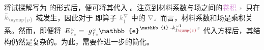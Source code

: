 将试探解写为  的形式后，便可将其代入 。注意到材料系数与场之间的\textcolor{Plum}{卷积} $\mathcolor{gray}{*}$ 只在 $\mathcolor{gray}{\bar{k}_{\symup{\rho}}}$ 域发生，因此对于  即算子 $\mathcolor{gray}{k^\nabla_{\check{1}}}$ 中的 $\mathcolor{gray}{\nabla_z}$ 而言，材料系数和场是乘积关系。然而，即便将 $\xint{\mathcolor{gray}{-}}{25}{E}^{\;\!\mathcolor{gray}{\omega}}_{\;\! \hat{1} \mathcolor{gray}{z}} = \xint{{}^{}_{\mathcolor{gray}{-}}}{10}{g}^{\;\!\mathcolor{gray}{\omega}}_{\;\! \breve{1} \mathcolor{gray}{z}} \mathbb{e}^{\mathbb{i} \xint{\begin{smallmatrix} ~ \\ {}^{}_{\mathcolor{gray}{-}} \\ ~ \end{smallmatrix}}{15}{k}_{\hat{1} \textcolor{Maroon}{\symup{z}}}^{\;\! \mathcolor{gray}{\omega} \breve{1}} \mathcolor{gray}{z}}$ 代入方程后，其结构仍然是复杂的。为此，需要作进一步的简化。

